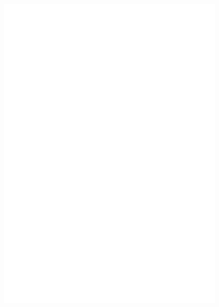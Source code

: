 \begin{frame}[allowframebreaks]
    \pagebreak
    \begin{figure}
        \vspace*{0pt}
        \centering
        \includegraphics[width=0.99\textwidth]{pic/p4-testbed}
    \end{figure}
      
\end{frame}


